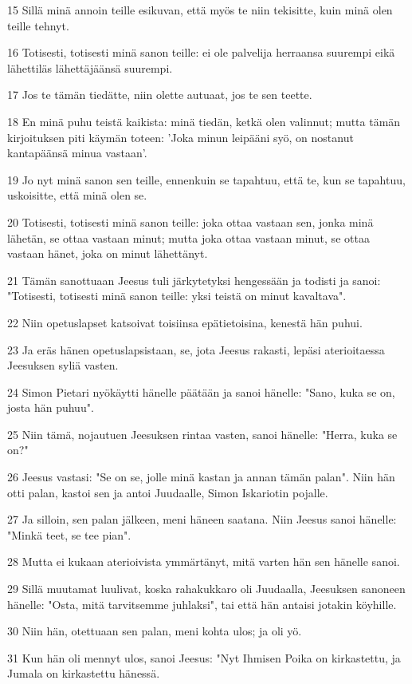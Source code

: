 \par 15 Sillä minä annoin teille esikuvan, että myös te niin tekisitte, kuin minä olen teille tehnyt.
\par 16 Totisesti, totisesti minä sanon teille: ei ole palvelija herraansa suurempi eikä lähettiläs lähettäjäänsä suurempi.
\par 17 Jos te tämän tiedätte, niin olette autuaat, jos te sen teette.
\par 18 En minä puhu teistä kaikista: minä tiedän, ketkä olen valinnut; mutta tämän kirjoituksen piti käymän toteen: 'Joka minun leipääni syö, on nostanut kantapäänsä minua vastaan'.
\par 19 Jo nyt minä sanon sen teille, ennenkuin se tapahtuu, että te, kun se tapahtuu, uskoisitte, että minä olen se.
\par 20 Totisesti, totisesti minä sanon teille: joka ottaa vastaan sen, jonka minä lähetän, se ottaa vastaan minut; mutta joka ottaa vastaan minut, se ottaa vastaan hänet, joka on minut lähettänyt.
\par 21 Tämän sanottuaan Jeesus tuli järkytetyksi hengessään ja todisti ja sanoi: "Totisesti, totisesti minä sanon teille: yksi teistä on minut kavaltava".
\par 22 Niin opetuslapset katsoivat toisiinsa epätietoisina, kenestä hän puhui.
\par 23 Ja eräs hänen opetuslapsistaan, se, jota Jeesus rakasti, lepäsi aterioitaessa Jeesuksen syliä vasten.
\par 24 Simon Pietari nyökäytti hänelle päätään ja sanoi hänelle: "Sano, kuka se on, josta hän puhuu".
\par 25 Niin tämä, nojautuen Jeesuksen rintaa vasten, sanoi hänelle: "Herra, kuka se on?"
\par 26 Jeesus vastasi: "Se on se, jolle minä kastan ja annan tämän palan". Niin hän otti palan, kastoi sen ja antoi Juudaalle, Simon Iskariotin pojalle.
\par 27 Ja silloin, sen palan jälkeen, meni häneen saatana. Niin Jeesus sanoi hänelle: "Minkä teet, se tee pian".
\par 28 Mutta ei kukaan aterioivista ymmärtänyt, mitä varten hän sen hänelle sanoi.
\par 29 Sillä muutamat luulivat, koska rahakukkaro oli Juudaalla, Jeesuksen sanoneen hänelle: "Osta, mitä tarvitsemme juhlaksi", tai että hän antaisi jotakin köyhille.
\par 30 Niin hän, otettuaan sen palan, meni kohta ulos; ja oli yö.
\par 31 Kun hän oli mennyt ulos, sanoi Jeesus: "Nyt Ihmisen Poika on kirkastettu, ja Jumala on kirkastettu hänessä.
